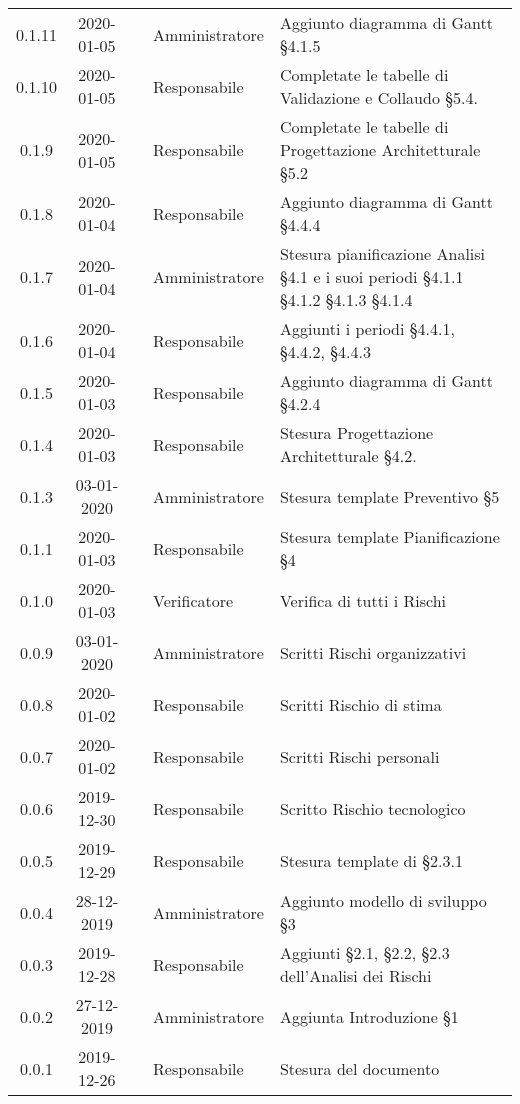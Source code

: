 {\begin{longtable}{ c c  C{4cm}  C{3cm} C{4cm}}
0.1.11 & 2020-01-05 & \LD{} & Amministratore & Aggiunto diagramma di Gantt §4.1.5 \\
0.1.10 & 2020-01-05 & \SE{} & Responsabile & Completate le tabelle di Validazione e Collaudo §5.4.\\
0.1.9 & 2020-01-05 & \SE{} & Responsabile & Completate le tabelle di Progettazione Architetturale §5.2\\
0.1.8 & 2020-01-04 & \SE{} & Responsabile & Aggiunto diagramma di Gantt §4.4.4 \\
0.1.7 & 2020-01-04 & \LD{} & Amministratore & Stesura pianificazione Analisi §4.1 e i suoi periodi §4.1.1 §4.1.2 §4.1.3 §4.1.4 \\
0.1.6 & 2020-01-04 & \SE{} & Responsabile & Aggiunti i periodi §4.4.1, §4.4.2, §4.4.3\\
0.1.5 & 2020-01-03 & \SE{} & Responsabile & Aggiunto diagramma di Gantt §4.2.4\\
0.1.4 & 2020-01-03 & \SE{} & Responsabile & Stesura Progettazione Architetturale §4.2.\\
0.1.3 & 03-01-2020 & \LD{} & Amministratore & Stesura template Preventivo §5\\
0.1.1 & 2020-01-03 &  \SE{} & Responsabile & Stesura template Pianificazione §4\\
0.1.0 & 2020-01-03 &\AT{} & Verificatore & Verifica di tutti i Rischi  \\
0.0.9 & 03-01-2020 & \LD{} & Amministratore & Scritti Rischi organizzativi \\
0.0.8 & 2020-01-02 &  \SE{} & Responsabile & Scritti Rischio di stima \\
0.0.7 & 2020-01-02 & \SE{} & Responsabile & Scritti Rischi personali \\
0.0.6 & 2019-12-30 & \SE{} & Responsabile & Scritto Rischio tecnologico \\
0.0.5 & 2019-12-29 & \SE{} & Responsabile & Stesura template di §2.3.1\\
0.0.4 & 28-12-2019 & \LD{} & Amministratore & Aggiunto modello di sviluppo §3\\
0.0.3 & 2019-12-28 & \SE{} & Responsabile & Aggiunti §2.1, §2.2, §2.3 dell'Analisi dei Rischi \\
0.0.2 & 27-12-2019 & \LD{} & Amministratore & Aggiunta Introduzione §1 \\
0.0.1 & 2019-12-26 & \SE{} & Responsabile & Stesura del documento  \\
		
\end{longtable}
}